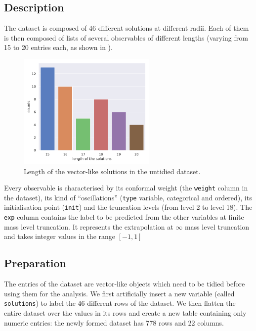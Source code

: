 \subsection{Description}

The dataset is composed of 46 different solutions at different radii.
Each of them is then composed of lists of several observables of different lengths (varying from 15 to 20 entries each, as shown in ).

\begin{figure}[htbp]
  \centering
  \includegraphics[width=0.6\textwidth]{img/sol_length}
  \caption{Length of the vector-like solutions in the untidied dataset.}
  \label{fig:lumps:length}
\end{figure}

Every observable is characterised by its conformal weight (the \texttt{weight} column in the dataset), its kind of ``oscillations'' (\texttt{type} variable, categorical and ordered), its initialisation point (\texttt{init}) and the truncation levels (from level 2 to level 18).
The \texttt{exp} column contains the label to be predicted from the other variables at finite mass level truncation.
It represents the extrapolation at $\infty$ mass level truncation and takes integer values in the range $[-1, 1]$


\subsection{Preparation}

The entries of the dataset are vector-like objects which need to be tidied before using them for the analysis.
We first artificially insert a new variable (called \texttt{solutions}) to label the 46 different rows of the dataset.
We then flatten the entire dataset over the values in its rows and create a new table containing only numeric entries: the newly formed dataset has 778 rows and 22 columns.

